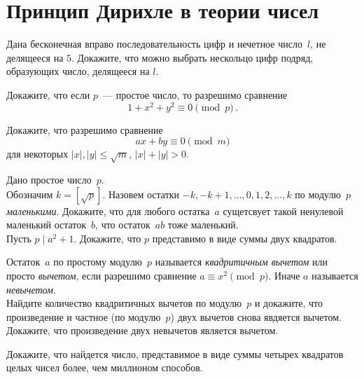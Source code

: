 
\section*{Принцип Дирихле в теории чисел}


\begin{problems}

\item
Дана бесконечная вправо последовательность цифр и нечетное число~$l$,
не делящееся на $5$.
Докажите, что можно выбрать нескольцо цифр подряд, образующих число, делящееся
на $l$. 

\item
Докажите, что если $p$~--- простое число, то разрешимо сравнение
\[
    1 + x^2 + y^2 \equiv 0 \pmod{p}
\,.\]

\item
Докажите, что разрешимо сравнение
\[
    a x + b y \equiv 0 \pmod{m}
\]
для некоторых $|x|, |y| \leq \sqrt{m}$, $|x| + |y| > 0$.
 
\item
Дано простое число~$p$.
\\
\sp
Обозначим $k = [\sqrt{p}]$.
Назовем остатки $- k, - k + 1, \ldots, 0, 1, 2, \ldots, k$ по модулю~$p$
\emph{маленькими}.
Докажите, что для любого остатка~$a$ сущетсвует такой ненулевой маленький
остаток~$b$, что остаток~$a b$ тоже маленький.
\\
\sp
Пусть $p \mid a^2 + 1$.
Докажите, что $p$ представимо в виде суммы двух квадратов.


\item
Остаток~$a$ по простому модулю~$p$ называется \emph{квадритичным вычетом} или
просто \emph{вычетом}, если разрешимо сравнение $a \equiv x^2 \pmod{p}$.
Иначе $a$ называется \emph{невычетом}.
\\
\sp
Найдите количество квадритичных вычетов по модулю~$p$ и докажите, что
произведение и частное (по модулю~$p$) двух вычетов снова явдяется вычетом.
\\
\sp
Докажите, что произведение двух невычетов является вычетом.

\item
Докажите, что найдется число, представимое в виде суммы четырех квадратов целых
чисел более, чем миллионом способов.

\end{problems}

